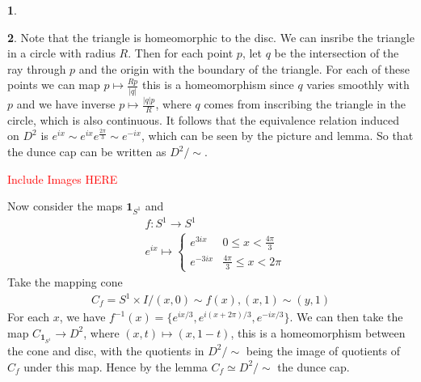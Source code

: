 \documentclass[10.5pt]{article}
\theoremstyle{definition}
\newtheorem{pb}{}
\newcommand{\set}[1]{\{#1\}}
\newcommand{\abs}[1]{\lvert#1\rvert}
\newcommand{\ism}{\simeq}
\begin{document}
    \begin{pb}
        
    \end{pb}
    \begin{pb}
        Note that the triangle is homeomorphic to the disc. We can insribe the triangle in a circle with radius \(R\). Then for each point \(p\), let \(q\) be the intersection
        of the ray through \(p \) and the origin with the boundary of the triangle. For each of these points we can map \(p \mapsto \frac{Rp }{\abs{q }}\) this is a homeomorphism
        since \(q\) varies smoothly with \(p\) and we have inverse \(p \mapsto \frac{\abs{q}p}{R}\), where \(q\) comes from inscribing the triangle in the circle, which is also continuous.
        It follows that the equivalence relation induced on \(D^2\) is \(e^{ix} \sim e^{ix}e^{\frac{2\pi}{3}} \sim e^{-ix}\), which can be seen by the picture and lemma. So that
        the dunce cap can be written as \(D^2/\sim\).

        \textcolor{red}{Include Images HERE}

        Now consider the maps \(\mathbf{1}_{S^1}\) and
        \begin{align*}
            &f:S^1 \to S^1 \\
            &e^{ix} \mapsto \begin{cases}
                e^{3ix} & 0 \leq x < \frac{4\pi}{3} \\
                e^{-3ix} & \frac{4\pi}{3} \leq x < 2\pi
            \end{cases}
        \end{align*}
        Take the mapping cone 
        \begin{align*}
            C_f = S^1 \times I / (x,0) \sim f(x), (x,1) \sim (y,1)
        \end{align*}
        For each \(x\), we have \(f^{-1}(x) = \set{e^{ix/3},e^{i(x + 2\pi)/3},e^{-ix/3}}\). We can then take the map \(C_{\mathbf{1}_{S^1}} \to D^2\), where \((x,t) \mapsto (x,1-t)\), this is a homeomorphism between the
        cone and disc, with the quotients in \(D^2/\sim\) being the image of quotients of \(C_f\) under this map. Hence by the lemma \(C_f \ism D^2/\sim\) the dunce cap.


\end{pb}
\end{document}
